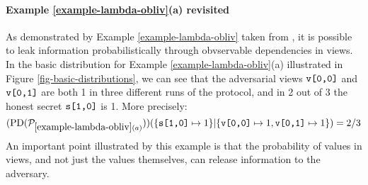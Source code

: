 \paragraph{Example \ref{example-lambda-obliv}(a) revisited} As demonstrated
by Example \ref{example-lambda-obliv} taken from \cite{darais2019language}, it is possible
to leak information probabilistically through obvservable dependencies
in views. In the basic distribution for Example \ref{example-lambda-obliv}(a)
illustrated in Figure \ref{fig-basic-distributions}, we can see that
the adversarial views $\texttt{v[0,0]}$ and $\texttt{v[0,1]}$ are both 1 in
three different runs of the protocol, and in 2 out of 3 the
honest secret $\texttt{s[1,0]}$ is 1. More precisely:
$$
(\mathrm{PD}(\mathcal{P}_{\ref{example-lambda-obliv}(a)}))(\{\texttt{s[1,0]} \mapsto 1 \}|\{ \texttt{v[0,0]} \mapsto 1, \texttt{v[0,1]} \mapsto 1 \}) = 2/3
$$
An important point illustrated by this example is that the
probability of values in views, and not just the values themselves,
can release information to the adversary.

